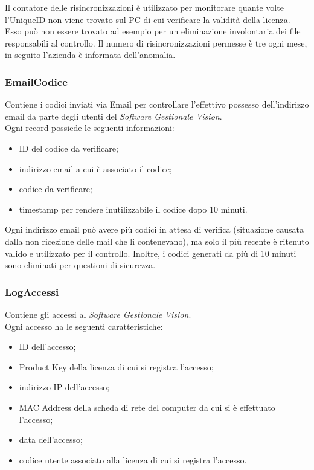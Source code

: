 Il contatore delle risincronizzazioni è utilizzato per monitorare quante volte l'UniqueID non viene trovato sul PC di cui verificare la validità della licenza. Esso può non essere trovato ad esempio per un eliminazione involontaria dei file responsabili al controllo. Il numero di risincronizzazioni permesse è tre ogni mese, in seguito l'azienda è informata dell'anomalia.


\subsubsection{EmailCodice}

Contiene i codici inviati via Email per controllare l’effettivo possesso dell’indirizzo email da parte degli utenti del \textit{Software Gestionale Vision}.
\\Ogni record possiede le seguenti informazioni:

\begin{itemize}
\item ID del codice da verificare;
\item indirizzo email a cui è associato il codice;
\item codice da verificare;
\item timestamp per rendere inutilizzabile il codice dopo 10 minuti.
\end{itemize}

Ogni indirizzo email può avere più codici in attesa di verifica (situazione causata dalla non ricezione delle mail che li contenevano), ma solo il più recente è ritenuto valido e utilizzato per il controllo. Inoltre, i codici generati da più di 10 minuti sono eliminati per questioni di sicurezza.

\subsubsection{LogAccessi}

Contiene gli accessi al \textit{Software Gestionale Vision}.
\\Ogni accesso ha le seguenti caratteristiche:

\begin{itemize}
\item ID dell'accesso;
\item Product Key della licenza di cui si registra l'accesso;
\item indirizzo IP dell'accesso;
\item MAC Address della scheda di rete del computer da cui si è effettuato l'accesso;
\item data dell'accesso;
\item codice utente associato alla licenza di cui si registra l'accesso.
\end{itemize}

